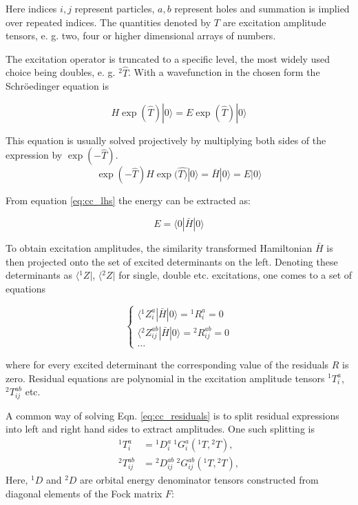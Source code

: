 Here indices $i, j$ represent particles, $a, b$ represent holes and summation 
is implied over repeated indices. The quantities denoted by $T$ are 
excitation amplitude tensors, e. g. two, four or higher dimensional arrays of 
numbers.

The excitation operator is truncated to a specific level, the most widely used 
choice being doubles, e. g. ${}^{2}\hat{T}$. With a wavefunction in the 
chosen form the Schr{\"o}edinger equation is

\begin{equation}
 H \exp(\hat{T}) |0 \rangle = E \exp(\hat{T}) |0 \rangle
\end{equation}

This equation is usually solved projectively by multiplying both sides of the 
expression by $\exp(-\hat{T})$. 
\begin{equation}
 \exp(-\hat{T}) H \exp(\hat{T)} | 0 \rangle = \bar{H} | 0 \rangle = E | 0 
\rangle
\label{eq:cc_lhs}
\end{equation}

From equation \ref{eq:cc_lhs} the energy can be extracted as:

\begin{equation}
 E = \langle 0 | \bar{H} | 0 \rangle
\end{equation}

To obtain excitation amplitudes, the similarity transformed Hamiltonian 
$\bar{H}$ is then projected onto the set of excited determinants on the left.
Denoting these determinants as $\langle {}^{1}Z |$, $\langle {}^{2}Z|$
for single, double etc. excitations, one comes to a set of equations

\begin{equation}
\begin{cases}
 \langle {}^{1} Z_{i}^{a} | \bar{H} | 0 \rangle = {}^{1}R_{i}^{a} = 0 \\
 \langle {}^{2} Z_{ij}^{ab} | \bar{H} | 0 \rangle = {}^{2}R_{ij}^{ab} = 0 \\
 \ldots
\end{cases}
\label{eq:cc_residuals}
\end{equation}

where for every excited determinant the corresponding value of the residuals 
$R$ is zero. Residual equations are polynomial in the excitation amplitude 
tensors ${}^{1}T_{i}^{a}$, ${}^{2}T_{ij}^{ab}$ etc.

A common way of solving Eqn. \ref{eq:cc_residuals} is to split residual 
expressions into left and right hand sides to extract amplitudes. One such 
splitting is
\begin{subequations}
\begin{align}
 {}^{1}T_{i}^{a} &= {}^{1}D_{i}^{a} ~ {}^{1}G_{i}^{a}({}^{1}T, {}^{2}T), \\
{}^{2}T_{ij}^{ab} &= {}^{2}D_{ij}^{ab} ~ {}^{2}G_{ij}^{ab}({}^{1}T, {}^{2}T), 
\label{eq:cc_amplitude_equations_b}
\end{align}
\label{eq:cc_amplitude_equations}
\end{subequations}
Here, ${}^1D$ and ${}^2D$ are orbital energy
denominator tensors constructed from diagonal elements of the Fock matrix
$F$:

